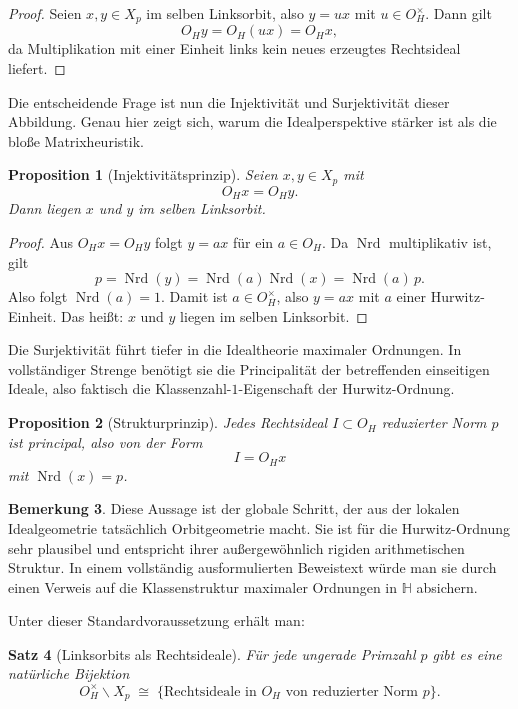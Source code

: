 \documentclass[12pt,a4paper]{article}
\newtheorem{satz}{Satz}[section]
\newtheorem{proposition}[satz]{Proposition}
\theoremstyle{definition}
\newtheorem{bemerkung}[satz]{Bemerkung}
\newcommand{\OH}{O_H}
\newcommand{\HH}{\mathbb{H}}
\newcommand{\Nrd}{\operatorname{Nrd}}
\begin{document}
	\begin{proof}
		Seien \(x,y\in X_p\) im selben Linksorbit, also \(y=ux\) mit \(u\in \OH^\times\). Dann gilt
		\[
		\OH y=\OH (ux)=\OH x,
		\]
		da Multiplikation mit einer Einheit links kein neues erzeugtes Rechtsideal liefert.
	\end{proof}
	
	Die entscheidende Frage ist nun die Injektivität und Surjektivität dieser Abbildung. Genau hier zeigt sich, warum die Idealperspektive stärker ist als die bloße Matrixheuristik.
	
	\begin{proposition}[Injektivitätsprinzip]
		Seien \(x,y\in X_p\) mit
		\[
		\OH x=\OH y.
		\]
		Dann liegen \(x\) und \(y\) im selben Linksorbit.
	\end{proposition}
	
	\begin{proof}
		Aus \(\OH x=\OH y\) folgt \(y=ax\) für ein \(a\in \OH\). Da \(\Nrd\) multiplikativ ist, gilt
		\[
		p=\Nrd(y)=\Nrd(a)\Nrd(x)=\Nrd(a)\,p.
		\]
		Also folgt \(\Nrd(a)=1\). Damit ist \(a\in \OH^\times\), also \(y=ax\) mit \(a\) einer Hurwitz-Einheit. Das heißt: \(x\) und \(y\) liegen im selben Linksorbit.
	\end{proof}
	
	Die Surjektivität führt tiefer in die Idealtheorie maximaler Ordnungen. In vollständiger Strenge benötigt sie die Principalität der betreffenden einseitigen Ideale, also faktisch die Klassenzahl-\(1\)-Eigenschaft der Hurwitz-Ordnung.
	
	\begin{proposition}[Strukturprinzip]
		Jedes Rechtsideal \(I\subset \OH\) reduzierter Norm \(p\) ist principal, also von der Form
		\[
		I=\OH x
		\]
		mit \(\Nrd(x)=p\).
	\end{proposition}
	
	\begin{bemerkung}
		Diese Aussage ist der globale Schritt, der aus der lokalen Idealgeometrie tatsächlich Orbitgeometrie macht. Sie ist für die Hurwitz-Ordnung sehr plausibel und entspricht ihrer außergewöhnlich rigiden arithmetischen Struktur. In einem vollständig ausformulierten Beweistext würde man sie durch einen Verweis auf die Klassenstruktur maximaler Ordnungen in \(\HH\) absichern.
	\end{bemerkung}
	
	Unter dieser Standardvoraussetzung erhält man:
	
	\begin{satz}[Linksorbits als Rechtsideale]
		Für jede ungerade Primzahl \(p\) gibt es eine natürliche Bijektion
		\[
		\OH^\times\backslash X_p
		\;\cong\;
		\{\text{Rechtsideale in }\OH\text{ von reduzierter Norm }p\}.
		\]
	\end{satz}
	
\end{document}
